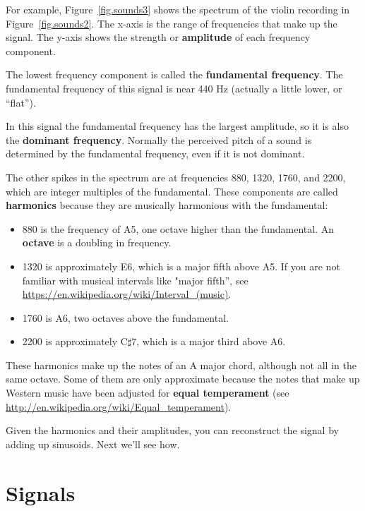 \documentclass[12pt]{book} \usepackage[width=5.5in,height=8.5in, hmarginratio=3:2,vmarginratio=1:1]{geometry}
\begin{document}
For example, Figure~\ref{fig.sounds3} shows the spectrum of the violin recording in Figure~\ref{fig.sounds2}. The x-axis is the range of frequencies that make up the signal. The y-axis shows the strength or {\bf amplitude} of each frequency component. 

The lowest frequency component is called the {\bf fundamental frequency}. The fundamental frequency of this signal is near 440 Hz (actually a little lower, or ``flat''). 

In this signal the fundamental frequency has the largest amplitude, so it is also the {\bf dominant frequency}. Normally the perceived pitch of a sound is determined by the fundamental frequency, even if it is not dominant. 

The other spikes in the spectrum are at frequencies 880, 1320, 1760, and 2200, which are integer multiples of the fundamental. These components are called {\bf harmonics} because they are musically harmonious with the fundamental: 

\begin{itemize} 

\item 880 is the frequency of A5, one octave higher than the fundamental. An {\bf octave} is a doubling in frequency. 

\item 1320 is approximately E6, which is a major fifth above A5. If you are not familiar with musical intervals like "major fifth'', see \url{https://en.wikipedia.org/wiki/Interval_(music)}. 

\item 1760 is A6, two octaves above the fundamental. 

\item 2200 is approximately C$\sharp$7, which is a major third above A6. 

\end{itemize} 

These harmonics make up the notes of an A major chord, although not all in the same octave. Some of them are only approximate because the notes that make up Western music have been adjusted for {\bf equal temperament} (see \url{http://en.wikipedia.org/wiki/Equal_temperament}). 

Given the harmonics and their amplitudes, you can reconstruct the signal by adding up sinusoids. Next we'll see how. 

\section{Signals} 
\end{document}
